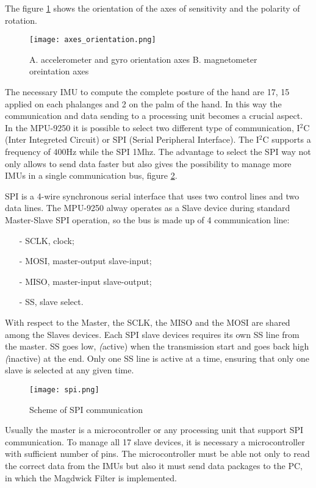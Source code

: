 The figure \ref{fig:axes} shows the orientation of the axes of sensitivity and the polarity of rotation.
\begin{figure}[h]
\centering
\texttt{[image: axes\_orientation.png]}
\caption{A. accelerometer and gyro orientation axes  B. magnetometer oreintation axes}
\label{fig:axes}
\end{figure}

The necessary IMU to compute the complete posture of the hand are 17, 15 applied on each phalanges and 2 on the palm of the  hand. 
In this way the communication and data sending to a processing unit becomes a  crucial aspect. In the MPU-9250 it is possible to select two different type of communication, I$^2$C (Inter Integreted Circuit) or SPI (Serial Peripheral Interface). The I$^2$C supports a frequency of 400Hz while the SPI  1Mhz. The advantage to select the SPI way not only allows to send  data faster but 
also gives the possibility to manage more IMUs in a single communication bus, figure \ref{fig:spi}.

SPI is a 4-wire synchronous serial interface that uses two control lines and two data lines. The MPU-9250 alway operates as a Slave device during standard Master-Slave SPI operation, so the bus is made up of 4 communication line:
\begin{itemize}
\item[-] SCLK, clock;
\item[-] MOSI, master-output slave-input;
\item[-] MISO, master-input slave-output;
\item[-] SS,   slave select.
\end{itemize}

\noindent With respect to the Master, the SCLK, the MISO and the MOSI are shared among the Slaves devices. Each SPI slave devices requires its own SS line from the master. SS goes low, \textit(active) when the transmission start and goes back high \textit(inactive) at the end. Only one SS line is active at a time, ensuring that only one slave is selected at any given time.   
\begin{figure}[h]
\centering
\texttt{[image: spi.png]}
\caption{Scheme of SPI communication}
\label{fig:spi}
\end{figure}


Usually the master is a microcontroller  or any processing unit that support SPI communication. To manage all 17 slave devices,  it is necessary a microcontroller with sufficient number of pins.   The microcontroller must be able not only to read the correct data from the IMUs but also it must send  data packages to the PC, in which the Magdwick Filter is implemented.   \\
\newline

